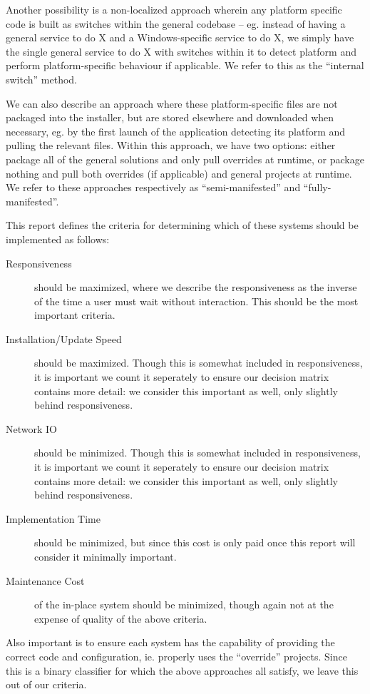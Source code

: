 \documentclass[12pt]{article}
\begin{document}
Another possibility is a non-localized approach wherein any platform specific code is built as switches within the general codebase -- eg. instead of having a general service to do X and a Windows-specific service to do X, we simply have the single general service to do X with switches within it to detect platform and perform platform-specific behaviour if applicable. We refer to this as the ``internal switch'' method.

We can also describe an approach where these platform-specific files are not packaged into the installer, but are stored elsewhere and downloaded when necessary, eg. by the first launch of the application detecting its platform and pulling the relevant files. Within this approach, we have two options: either package all of the general solutions and only pull overrides at runtime, or package nothing and pull both overrides (if applicable) and general projects at runtime. We refer to these approaches respectively as ``semi-manifested'' and ``fully-manifested''.

This report defines the criteria for determining which of these systems should be implemented as follows:
\begin{description}
\item[Responsiveness] should be maximized, where we describe the responsiveness as the inverse of the time a user must wait without interaction. This should be the most important criteria.
\item[Installation/Update Speed] should be maximized. Though this is somewhat included in responsiveness, it is important we count it seperately to ensure our decision matrix contains more detail: we consider this important as well, only slightly behind responsiveness.
\item[Network IO] should be minimized. Though this is somewhat included in responsiveness, it is important we count it seperately to ensure our decision matrix contains more detail: we consider this important as well, only slightly behind responsiveness.
\item[Implementation Time] should be minimized, but since this cost is only paid once this report will consider it minimally important.
\item[Maintenance Cost] of the in-place system should be minimized, though again not at the expense of quality of the above criteria.
\end{description}

Also important is to ensure each system has the capability of providing the correct code and configuration, ie. properly uses the ``override'' projects. Since this is a binary classifier for which the above approaches all satisfy, we leave this out of our criteria.
\end{document}
